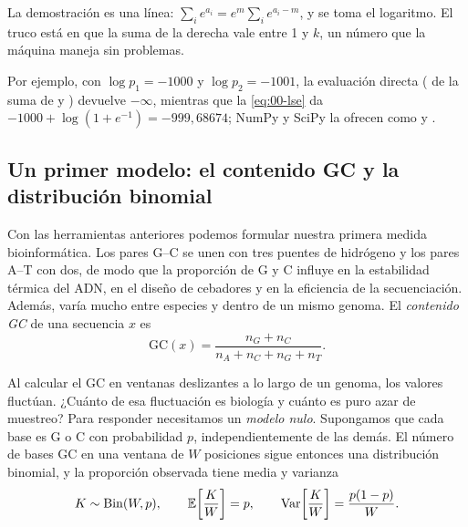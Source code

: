 \begin{simbolos}
\end{simbolos}

La demostración es una línea: $\sum_i e^{a_i} = e^{m}\sum_i e^{a_i-m}$, y se toma el logaritmo. El truco está en que la suma de la derecha vale entre 1 y $k$, un número que la máquina maneja sin problemas.

Por ejemplo, con $\log p_1=-1000$ y $\log p_2=-1001$, la evaluación directa ( de la suma de  y ) devuelve $-\infty$, mientras que la \cref{eq:00-lse} da $-1000+\log(1+e^{-1})=-999{,}68674$; NumPy y SciPy la ofrecen como  y .

\subsection{Un primer modelo: el contenido GC y la distribución binomial}

Con las herramientas anteriores podemos formular nuestra primera medida bioinformática. Los pares G--C se unen con tres puentes de hidrógeno y los pares A--T con dos, de modo que la proporción de G y C influye en la estabilidad térmica del ADN, en el diseño de cebadores y en la eficiencia de la secuenciación. Además, varía mucho entre especies y dentro de un mismo genoma. El \emph{contenido GC} de una secuencia $x$ es
\begin{equation}\label{eq:00-gc}
\mathrm{GC}(x) = \frac{n_G + n_C}{n_A + n_C + n_G + n_T}.
\end{equation}

\begin{simbolos}
\end{simbolos}

Al calcular el GC en ventanas deslizantes a lo largo de un genoma, los valores fluctúan. ¿Cuánto de esa fluctuación es biología y cuánto es puro azar de muestreo? Para responder necesitamos un \emph{modelo nulo}. Supongamos que cada base es G o C con probabilidad $p$, independientemente de las demás. El número de bases GC en una ventana de $W$ posiciones sigue entonces una distribución binomial, y la proporción observada tiene media y varianza
\begin{equation}\label{eq:00-binomial}
K\sim\mathrm{Bin}(W,p),\qquad \mathbb{E}\!\left[\frac{K}{W}\right]=p,\qquad \operatorname{Var}\!\left[\frac{K}{W}\right]=\frac{p(1-p)}{W}.
\end{equation}

